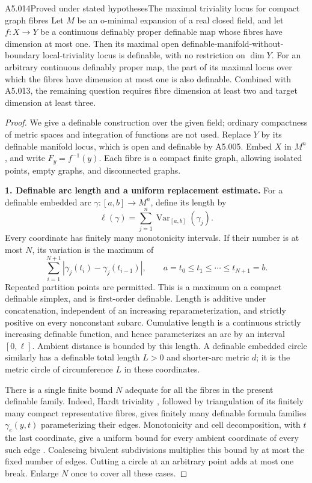 \begin{saresult}{A5.014}{Proved under stated hypotheses}{The maximal triviality locus for compact graph fibres}
Let $M$ be an o-minimal expansion of a real closed field, and let
$f:X\to Y$ be a continuous definably proper definable map whose
fibres have dimension at most one.  Then its maximal open
definable-manifold-without-boundary local-triviality locus is
definable, with no restriction on $\dim Y$.
For an arbitrary continuous definably proper map, the part of its
maximal locus over which the fibres have dimension at most one
is also definable.  Combined with A5.013, the remaining question
requires fibre dimension at least two and target dimension at
least three.
\end{saresult}
\begin{proof}
We give a definable construction over the given field; ordinary
compactness of metric spaces and integration of functions are
not used.  Replace $Y$ by its definable manifold locus, which is
open and definable by A5.005.  Embed $X$ in $M^n$, and write
$F_y=f^{-1}(y)$.  Each fibre is a compact finite graph, allowing
isolated points, empty graphs, and disconnected graphs.

\medskip\noindent\textbf{1. Definable arc length and a uniform replacement estimate.}
For a definable embedded arc $\gamma:[a,b]\to M^n$, define its
length by
\[
 \ell(\gamma)=\sum_{j=1}^n\operatorname{Var}_{[a,b]}(\gamma_j).
 \tag{A5.14.1}
\]
Every coordinate has finitely many monotonicity intervals.  If
their number is at most $N$, its variation is the maximum of
\[
 \sum_{i=1}^{N+1}|\gamma_j(t_i)-\gamma_j(t_{i-1})|,
 \qquad a=t_0\leq t_1\leq\cdots\leq t_{N+1}=b.
\]
Repeated partition points are permitted.  This is a maximum on
a compact definable simplex, and is first-order definable.
Length is additive under concatenation, independent of an
increasing reparameterization, and strictly positive on every
nonconstant subarc.  Cumulative length is a continuous strictly
increasing definable function, and hence parameterizes an arc
by an interval $[0,\ell]$.  Ambient distance is bounded by this
length.  A definable embedded circle similarly has a definable
total length $L>0$ and shorter-arc metric $d$; it is the metric
circle of circumference $L$ in these coordinates.

There is a single finite bound $N$ adequate for all the fibres
in the present definable family.  Indeed, Hardt triviality
\cite[Theorem 5.22, pp.62--63]{A5-Coste}, followed by
triangulation of its finitely many compact representative
fibres, gives finitely many definable formula families
$\gamma_e(y,t)$ parameterizing their edges.  Monotonicity and
cell decomposition, with $t$ the last coordinate, give a uniform
bound for every ambient coordinate of every such edge
\cite[Theorems 2.1, 2.9--2.10, pp.15, 19]{A5-Coste}.  Coalescing
bivalent subdivisions multiplies this bound by at most the fixed
number of edges.  Cutting a circle at an arbitrary point adds
at most one break.  Enlarge $N$ once to cover all these cases.


\end{proof}
